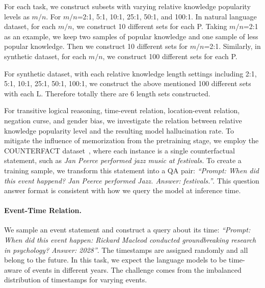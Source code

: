 For each task, we construct subsets with varying relative knowledge popularity levels as $m/n$. 
For $m/n$=2:1, 5:1, 10:1, 25:1, 50:1, and 100:1. 
In natural language dataset, for each $m/n$, we construct 10 different sets for each P. 
Taking $m/n$=2:1 as an example, we keep two samples of popular knowledge and one sample of less popular knowledge. 
Then we construct 10 different sets for $m/n$=2:1.
Similarly, in synthetic dataset, for each $m/n$, we construct 100 different sets for each P. 


For synthetic dataset, with each relative knowledge length settings including 2:1, 5:1, 10:1, 25:1, 50:1, 100:1, we construct the above mentioned 100 different sets with each $\text{L}$. Therefore totally there are 6 length sets constructed. 

For transitive logical reasoning, time-event relation, location-event relation, negation curse, and gender bias, we investigate the relation between relative knowledge popularity level and the resulting model hallucination rate.  To mitigate the influence of memorization from the pretraining stage, we employ the \textsc{COUNTERFACT} dataset~\cite{meng2022locating}, where each instance is a single counterfactual statement, such as \textit{Jan Peerce performed jazz music at festivals.} To create a training sample, we transform this statement into a QA pair: \textit{``Prompt: When did this event happend? Jan Peerce performed Jazz. Answer: festivals.''}. This question answer format is consistent with how we query the model at inference time.  



\paragraph{Event-Time Relation. }We sample an event statement and construct a query about its time: \textit{``Prompt: When did this event happen: Rickard Macleod conducted groundbreaking research in psychology? Answer: 2028''}. The timestamps are assigned randomly and all belong to the future.
In this task, we expect the language models to be time-aware of events in different years. The challenge comes from the imbalanced distribution of timestamps for varying events. 

